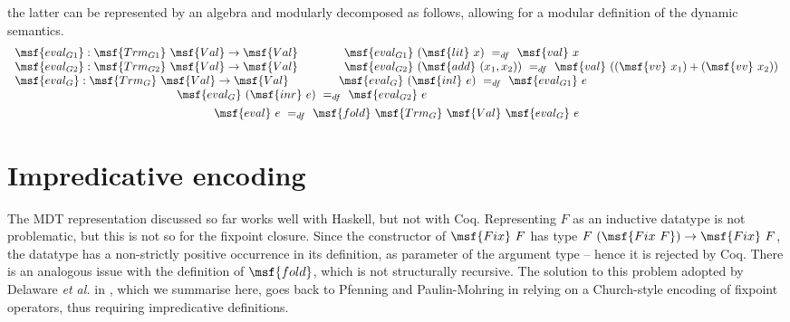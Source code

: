 \documentclass[submission,copyright,creativecommons]{eptcs}
\begin{document}
the latter can be represented by an algebra and modularly decomposed
as follows, allowing for a modular definition of the dynamic
semantics.
\begin{gather} \label{data-rhoX6}
\begin{array}{lll}
\msf{eval_{G1}} : \msf{Trm_{G1}} \ \msf{Val} \to \msf{Val} \qquad \qquad 
\msf{eval_{G1}} \ (\msf{lit} \ x) \ =_{df} \ \msf{val} \ x  \\
\msf{eval_{G2}} : \msf{Trm_{G2}} \ \msf{Val} \to \msf{Val}  \qquad \qquad
\msf{eval_{G2}} \ (\msf{add} \ (x_1, x_2))
\ =_{df} \ \msf{val} \ ((\msf{vv} \ x_1) + (\msf{vv} \ x_2)) \\
\msf{eval_G} : \msf{Trm_G} \ \msf{Val} \to \msf{Val}  \qquad \qquad \ 
\msf{eval_G} \ (\msf{inl} \ e) \ =_{df} \ \msf{eval_{G1}} \ e \\
\qquad \qquad \qquad \qquad \qquad \qquad \qquad \msf{eval_G} \ (\msf{inr}
\ e) \ =_{df} \ \msf{eval_{G2}} \ e
\end{array} \\
\label{data-rhoX7}
\msf{eval} \ e \ =_{df} \ 
   \msf{fold} \ \msf{Trm_G} \ \msf{Val} \ \msf{eval_G} \ e
\end{gather}








\section{Impredicative encoding}  \label{section:one}

The MDT representation discussed so far works well with Haskell, but
not with Coq. Representing $F$ as an inductive datatype is not
problematic, but this is not so for the fixpoint closure. Since the
constructor of $\msf{Fix} \ F$ has type $ F \ (\msf{Fix \ F}) \to
\msf{Fix} \ F$, the datatype has a non-strictly positive occurrence in
its definition, as parameter of the argument type -- hence it is
rejected by Coq. There is an analogous issue with the definition of
$\msf{fold}$, which is not structurally recursive. The solution to
this problem adopted by Delaware \emph{et al.} in \cite{Dela13}, which
we summarise here, goes back to Pfenning and Paulin-Mohring
\cite{PfenningP89} in relying on a Church-style encoding of fixpoint
operators, thus requiring impredicative definitions.
\end{document}

